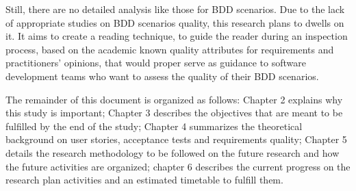 Still, there are no detailed analysis like those for BDD scenarios. Due to the lack of appropriate studies on BDD scenarios quality, this research plans to dwells on it. It aims to create a reading technique, to guide the reader during an inspection process, based on the academic known quality attributes for requirements and practitioners' opinions, that would proper serve as guidance to software development teams who want to assess the quality of their BDD scenarios.

The remainder of this document is organized as follows: Chapter 2 explains why this study is important; Chapter 3 describes the objectives that are meant to be fulfilled by the end of the study; Chapter 4 summarizes the theoretical background on user stories, acceptance tests and requirements quality; Chapter 5 details the research methodology to be followed on the future research and how the future activities are organized; chapter 6 describes the current progress on the research plan activities and an estimated timetable to fulfill them.